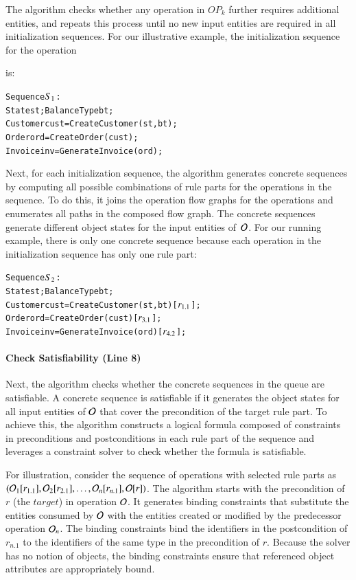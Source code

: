 The algorithm checks whether any operation in $OP_k$ further requires additional
entities, and repeats this process until no new input entities are required in
all initialization sequences.  For our illustrative example, the initialization
sequence for the operation \subject{GenerateInvoice} is:

\vspace*{-4pt}
{\scriptsize
\begin{alltt}
 Sequence \(S\sb{1}\):
 State st; BalanceType bt;
 Customer cust = CreateCustomer(st, bt);  
 Order ord = CreateOrder(cust);
 Invoice inv = GenerateInvoice(ord);  
\end{alltt}
}
\vspace*{-5pt}

Next, for each initialization sequence, the algorithm generates concrete
sequences by computing all possible combinations of rule parts for the
operations in the sequence. To do this, it joins the operation flow graphs for
the operations and enumerates all paths in the composed flow graph. The concrete
sequences generate different object states for the input entities of~${\cal
  O}$. For our running example, there is only one concrete sequence because each
operation in the initialization sequence has only one rule part:

\vspace*{-4pt}
{\scriptsize
\begin{alltt}
 Sequence \(S\sb{2}\):
 State st; BalanceType bt;
 Customer cust = CreateCustomer(st, bt) [\(r\sb{1.1}\)];
 Order ord = CreateOrder(cust) [\(r\sb{3.1}\)];	
 Invoice inv = GenerateInvoice(ord) [\(r\sb{4.2}\)];  
\end{alltt}
}
\vspace*{-5pt}

\paragraph*{Check Satisfiability (Line 8)} Next, the algorithm checks whe\-ther 
the concrete sequences in the queue are satisfiable. A concrete sequence is
satisfiable if it generates the object states for all input entities of ${\cal
  O}$ that cover the precondition of the target rule part. To achieve this, the
algorithm constructs a logical formula composed of constraints in preconditions
and postconditions in each rule part of the sequence and leverages a constraint
solver to check whether the formula is satisfiable.

For illustration, consider the sequence of operations with selected rule parts
as $({\cal O}_1 [r_{1.1}], {\cal O}_2 [r_{2.1}], \ldots, {\cal O}_n [r_{n.1}],
{\cal O} [r])$.  The algorithm starts with the precondition of $r$ (the
$target$) in operation ${\cal O}$.  It generates binding constraints that
substitute the entities consumed by ${\cal O}$ with the entities created or
modified by the predecessor operation ${\cal O}_n$. The binding constraints bind
the identifiers in the postcondition of $r_{n.1}$ to the identifiers of the same
type in the precondition of $r$. Because the solver has no notion of objects,
the binding constraints ensure that referenced object attributes are
appropriately bound.

